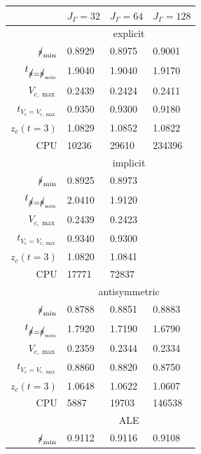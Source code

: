 \begin{table}
\center
\hspace*{-3.25cm}
\begin{tabular}{rlll}
\hline
 & $J_\Gamma=32$ & $J_\Gamma=64$ & $J_\Gamma=128$ \\
\hline
& \multicolumn{3}{c}{explicit} \\
\cmidrule{2-4}
$\mbox{$s\!\!\!\!\:/$}_{\min}$                & 0.8929 & 0.8975 & 0.9001 \\
$t_{\strikes = \strikes_{\min}}$ & 1.9040 & 1.9040 & 1.9170 \\
$V_{c,\max}$                     & 0.2439 & 0.2424 & 0.2411 \\
$t_{V_c = V_{c,\max}}$           & 0.9350 & 0.9300 & 0.9180 \\
$z_c(t=3)$                       & 1.0829 & 1.0852 & 1.0822 \\
CPU                              &  10236 &  29610 & 234396 \\
\cmidrule{2-4}
& \multicolumn{3}{c}{implicit} \\
\cmidrule{2-4}
$\mbox{$s\!\!\!\!\:/$}_{\min}$                & 0.8925 & 0.8973 & \\
$t_{\strikes = \strikes_{\min}}$ & 2.0410 & 1.9120 & \\
$V_{c,\max}$                     & 0.2439 & 0.2423 & \\
$t_{V_c = V_{c,\max}}$           & 0.9340 & 0.9300 & \\
$z_c(t=3)$                       & 1.0820 & 1.0841 & \\
CPU                              &  17771 &  72837 & \\
\cmidrule{2-4}
& \multicolumn{3}{c}{antisymmetric} \\
\cmidrule{2-4}
$\mbox{$s\!\!\!\!\:/$}_{\min}$                & 0.8788 & 0.8851 & 0.8883 \\
$t_{\strikes = \strikes_{\min}}$ & 1.7920 & 1.7190 & 1.6790 \\
$V_{c,\max}$                     & 0.2359 & 0.2344 & 0.2334 \\
$t_{V_c = V_{c,\max}}$           & 0.8860 & 0.8820 & 0.8750 \\
$z_c(t=3)$                       & 1.0648 & 1.0622 & 1.0607 \\
CPU                              &   5887 &  19703 & 146538 \\
\cmidrule{2-4}
& \multicolumn{3}{c}{ALE} \\
\cmidrule{2-4}
$\mbox{$s\!\!\!\!\:/$}_{\min}$                & 0.9112 & 0.9116 & 0.9108 \\

\end{tabular}
\end{table}

